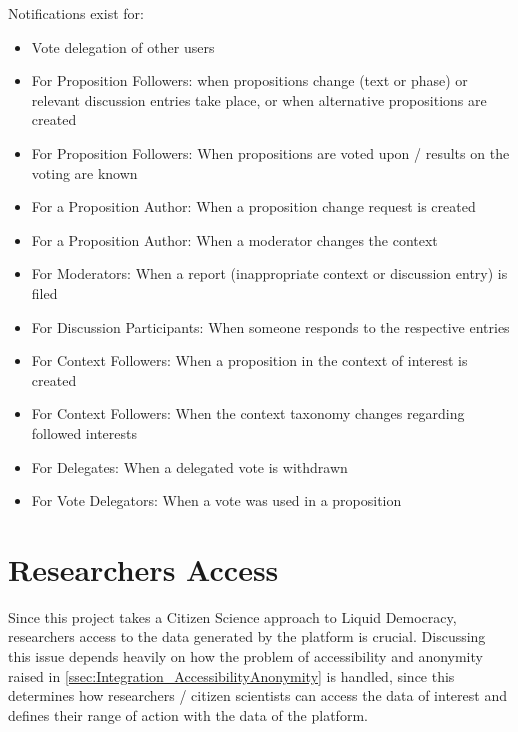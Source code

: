 Notifications exist for:
\begin{itemize}
\item Vote delegation of other users 
\item For Proposition Followers: when propositions change (text or phase) or relevant discussion entries take place, or when alternative propositions are created
\item For Proposition Followers: When propositions are voted upon / results on the voting are known
\item For a Proposition Author: When a proposition change request is created
\item For a Proposition Author: When a moderator changes the context
\item For Moderators: When a report (inappropriate context or discussion entry) is filed
\item For Discussion Participants: When someone responds to the respective entries
\item For Context Followers: When a proposition in the context of interest is created
\item For Context Followers: When the context taxonomy changes regarding followed interests
\item For Delegates: When a delegated vote is withdrawn
\item For Vote Delegators: When a vote was used in a proposition 
\end{itemize}

\section{Researchers Access}
\label{sec:Model_ResearchersAccess}
% 
% 
% 
Since this project takes a Citizen Science approach to Liquid Democracy, researchers access to the data generated by the platform is crucial. Discussing this issue depends heavily on how the problem of accessibility and anonymity raised in \ref{ssec:Integration_AccessibilityAnonymity} is handled, since this determines how researchers / citizen scientists can access the data of interest and defines their range of action with the data of the platform. 

